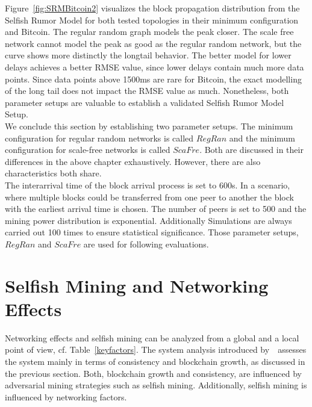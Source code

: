Figure~\ref{fig:SRMBitcoin2} visualizes the block propagation distribution from the Selfish Rumor Model for both tested topologies in their minimum configuration and Bitcoin. The regular random graph models the peak closer. The scale free network cannot model the peak as good as the regular random network, but the curve shows more distinctly the longtail behavior. The better model for lower delays achieves a better RMSE value, since lower delays contain much more data points. Since data points above 1500ms are rare for Bitcoin, the exact modelling of the long tail does not impact the RMSE value as much. Nonetheless, both parameter setups are valuable to establish a validated Selfish Rumor Model Setup.\\
We conclude this section by establishing two parameter setups. The minimum configuration for regular random networks is called $RegRan$ and the minimum configuration for scale-free networks is called $ScaFre$. Both are discussed in their differences in the above chapter exhaustively. However, there are also characteristics both share.\\
The interarrival time of the block arrival process is set to 600s. In a scenario, where multiple blocks could be transferred from one peer to another the block with the earliest arrival time is chosen. The number of peers is set to 500 and the mining power distribution is exponential. Additionally Simulations are always carried out 100 times to ensure statistical significance.
Those parameter setups, $RegRan$ and $ScaFre$ are used for following evaluations.

\section{Selfish Mining and Networking Effects}
Networking effects and selfish mining can be analyzed from a global and a local point of view, cf. Table~\ref{keyfactors}. The system analysis introduced by~~assesses the system mainly in terms of consistency and blockchain growth, as discussed in the previous section. Both, blockchain growth and consistency, are influenced by adversarial mining strategies such as selfish mining. Additionally, selfish mining is influenced by networking factors.

